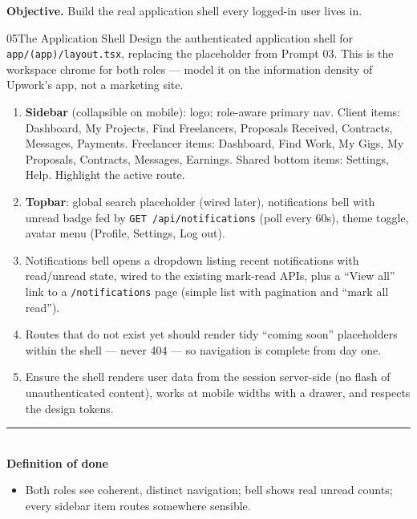 \documentclass[11pt,a4paper]{article}
\newcommand{\dod}{\medskip\noindent\textcolor{donegreen}{\rule{\linewidth}{0.5pt}}\\[1mm]\textbf{\textcolor{donegreen}{Definition of done}}\\[-2mm]}
\newcommand{\objective}[1]{\noindent\textbf{Objective.} #1\medskip}
\begin{document}
\objective{Build the real application shell every logged-in user lives in.}

\begin{promptbox}{05}{The Application Shell}
Design the authenticated application shell for \texttt{app/(app)/layout.tsx},
replacing the placeholder from Prompt 03. This is the workspace chrome for both
roles --- model it on the information density of Upwork's app, not a marketing site.

\begin{enumerate}[leftmargin=1.6em]
  \item \textbf{Sidebar} (collapsible on mobile): logo; role-aware primary nav.
        Client items: Dashboard, My Projects, Find Freelancers, Proposals Received,
        Contracts, Messages, Payments. Freelancer items: Dashboard, Find Work, My
        Gigs, My Proposals, Contracts, Messages, Earnings. Shared bottom items:
        Settings, Help. Highlight the active route.
  \item \textbf{Topbar}: global search placeholder (wired later), notifications bell
        with unread badge fed by \texttt{GET /api/notifications} (poll every 60s),
        theme toggle, avatar menu (Profile, Settings, Log out).
  \item Notifications bell opens a dropdown listing recent notifications with
        read/unread state, wired to the existing mark-read APIs, plus a ``View all''
        link to a \texttt{/notifications} page (simple list with pagination and
        ``mark all read'').
  \item Routes that do not exist yet should render tidy ``coming soon'' placeholders
        within the shell --- never 404 --- so navigation is complete from day one.
  \item Ensure the shell renders user data from the session server-side (no flash of
        unauthenticated content), works at mobile widths with a drawer, and respects
        the design tokens.
\end{enumerate}

\dod
\begin{itemize}[leftmargin=1.6em]
  \item Both roles see coherent, distinct navigation; bell shows real unread counts;
        every sidebar item routes somewhere sensible.
\end{itemize}
\end{promptbox}

\end{document}
